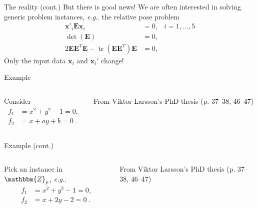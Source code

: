 \documentclass[aspectratio=169]{beamer}
\makeatletter
\newcommand{\mat}[1]{\bm{#1}}
\newcommand{\Z}{\ensuremath{\mathbbm{Z}}}
\DeclareMathOperator{\tr}{tr}
\newcommand{\T}{T}
\DeclareRobustCommand\eg{\emph{e.g}\@ifnextchar.{}{.\@}}
\makeatother
\begin{document}
\begin{frame}{The reality (cont.)}
But there is good news!
We are often interested in solving generic problem instances, \eg{} the relative pose
problem
\begin{equation*}
\begin{aligned}
    \mat{x}'_i\mat{E}\mat{x}_i &= 0, &i=1,\ldots,5\\
    \det(\mat{E}) &= 0, &\\
    2\mat{EE}^\T\mat{E}- \tr(\mat{EE}^\T)\mat{E} &= 0, &
\end{aligned}
\end{equation*}
Only the input data $\mat{x}_i$ and $\mat{x}_i'$ change!
\end{frame}

\begin{frame}[t]{Example}
\vspace{1cm}
\begin{columns}
    \begin{column}{0.7\textwidth}
        Consider
        \begin{equation*}
        \begin{aligned}
            f_1 &= x^2+y^2-1=0, \\
            f_2 &= x + ay + b =0\;.
        \end{aligned}
        \end{equation*}
    \end{column}%
    \begin{column}{0.3\textwidth}
        \centering
        

        \vspace{5mm}

        {\scriptsize From Viktor Larsson's PhD thesis (p. 37--38, 46--47)}
    \end{column}
\end{columns}
\end{frame}

\begin{frame}[t]{Example (cont.)}
\vspace{1cm}
\begin{columns}
    \begin{column}{0.7\textwidth}
        Pick an instance in $\Z_p$, \eg{}
        \begin{equation*}
        \begin{aligned}
            f_1 &= x^2+y^2-1=0, \\
            f_2 &= x + 2y - 2 =0\;.
        \end{aligned}
        \end{equation*}
    \end{column}%
    \begin{column}{0.3\textwidth}
        \centering
        

        \vspace{5mm}

        {\scriptsize From Viktor Larsson's PhD thesis (p. 37--38, 46--47)}
    \end{column}
\end{columns}
\end{frame}
\end{document}
